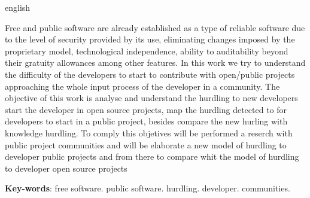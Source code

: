 \begin{resumo}[Abstract]
 \begin{otherlanguage*}{english}
   
Free and public software are already established as a type of reliable software
due to the level of security provided by its use, eliminating changes
imposed by the proprietary model, technological independence, ability to
auditability beyond their gratuity allowances among other features.
%
In this work we try to understand the difficulty of the developers to start
to contribute with open/public projects approaching the whole input process of
the developer in a community.
%
The objective of this work is analyse and understand the hurdling to new developers
start the developer in open source projects, map the hurdling detected to for
developers to start in a public project, besides compare the new hurling with
knowledge hurdling.
%
To comply this objetives will be performed a reserch with public project communities
and will be elaborate a new model of hurdling to developer public projects and
from there to compare whit the model of hurdling to developer open source projects

   \vspace{\onelineskip}
 
   \noindent 
   \textbf{Key-words}: free software. public software. hurdling. developer. communities.
 \end{otherlanguage*}
\end{resumo}
